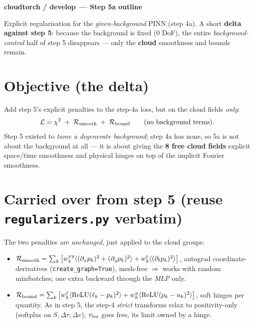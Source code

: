 \documentclass[10pt,a4paper]{article}
\newcommand{\co}[1]{{\small\texttt{#1}}}
\begin{document}
\small

{\sffamily\bfseries\large\color{acc} cloudtorch / develop\, --- Step 5a outline}

\vspace{1pt}
{\sffamily\color{gry}\footnotesize Explicit regularisation for the \emph{given-background} PINN (step 4a). A short \textbf{delta against step 5}: because the background is fixed (0 DoF), the entire \emph{background-control} half of step 5 disappears --- only the \textbf{cloud} smoothness and bounds remain.}

\vspace{1pt}{\footnotesize\color{gry}\rule{\textwidth}{0.4pt}}

\section{Objective (the delta)}

Add step 5's explicit penalties to the step-4a loss, but on the cloud fields \emph{only}:
\[
\mathcal L=\chi^2 \;+\; \mathcal R_{\rm smooth}\;+\;\mathcal R_{\rm bound}\qquad(\text{no background terms}).
\]
Step 5 existed to \emph{tame a degenerate background}; step 4a has none, so 5a is not about the background at all --- it is about giving the \textbf{8 free cloud fields} explicit space/time smoothness and physical hinges on top of the implicit Fourier smoothness.

\section{Carried over from step 5 (reuse \co{regularizers.py} verbatim)}

The two penalties are \emph{unchanged}, just applied to the cloud groups:
\begin{itemize}
\item $\mathcal R_{\rm smooth}=\sum_k\big[w^{xy}_k\langle(\partial_x p_k)^2+(\partial_y p_k)^2\rangle+w^{t}_k\langle(\partial_t p_k)^2\rangle\big]$, autograd coordinate-derivatives (\co{create\_graph=True}), mesh-free $\Rightarrow$ works with random minibatches; one extra backward through the \emph{MLP} only.
\item $\mathcal R_{\rm bound}=\sum_k\big[w^{\ell}_k\langle\mathrm{ReLU}(\ell_k-p_k)^2\rangle+w^{u}_k\langle\mathrm{ReLU}(p_k-u_k)^2\rangle\big]$, soft hinges per quantity. As in step 5, the step-4 \emph{strict} transforms relax to positivity-only (softplus on $S,\Delta\tau,\Delta v$); $v_{\rm los}$ goes free, its limit owned by a hinge.
\end{itemize}
\end{document}
